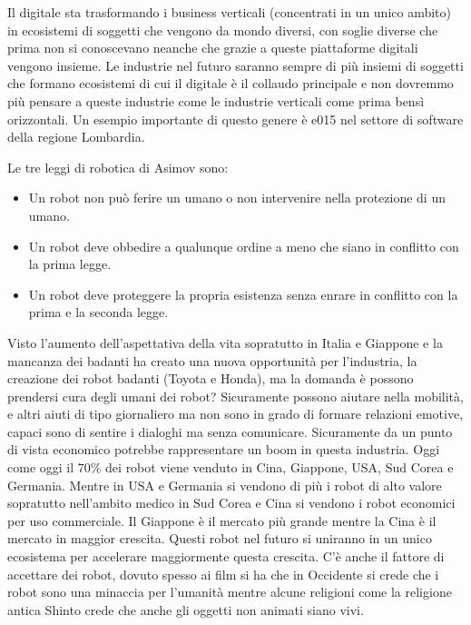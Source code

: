 \documentclass[a4page, 11pt]{article}
\begin{document}
Il digitale sta trasformando i business verticali (concentrati in un
unico ambito) in ecosistemi di soggetti che vengono da mondo diversi,
con soglie diverse che prima non si conoscevano neanche che grazie a
queste piattaforme digitali vengono insieme. Le industrie nel futuro
saranno sempre di più insiemi di soggetti che formano ecosistemi di cui
il digitale è il collaudo principale e non dovremmo più pensare a queste
industrie come le industrie verticali come prima bensì orizzontali. Un
esempio importante di questo genere è e015 nel settore di software della
regione Lombardia.

Le tre leggi di robotica di Asimov sono:

\begin{itemize}
	 
	\item
	Un robot non può ferire un umano o non intervenire nella protezione di
	un umano.
	\item
	Un robot deve obbedire a qualunque ordine a meno che siano in
	conflitto con la prima legge.
	\item
	Un robot deve proteggere la propria esistenza senza enrare in
	conflitto con la prima e la seconda legge.
\end{itemize}

Visto l'aumento dell'aspettativa della vita sopratutto in Italia e
Giappone e la mancanza dei badanti ha creato una nuova opportunità per
l'industria, la creazione dei robot badanti (Toyota e Honda), ma la
domanda è possono prendersi cura degli umani dei robot? Sicuramente
possono aiutare nella mobilità, e altri aiuti di tipo giornaliero ma non
sono in grado di formare relazioni emotive, capaci sono di sentire i
dialoghi ma senza comunicare. Sicuramente da un punto di vista economico
potrebbe rappresentare un boom in questa industria. Oggi come oggi il
70\% dei robot viene venduto in Cina, Giappone, USA, Sud Corea e
Germania. Mentre in USA e Germania si vendono di più i robot di alto
valore sopratutto nell'ambito medico in Sud Corea e Cina si vendono i
robot economici per uso commerciale. Il Giappone è il mercato più grande
mentre la Cina è il mercato in maggior crescita. Questi robot nel futuro
si uniranno in un unico ecosistema per accelerare maggiormente questa
crescita. C'è anche il fattore di accettare dei robot, dovuto spesso ai
film si ha che in Occidente si crede che i robot sono una minaccia per
l'umanità mentre alcune religioni come la religione antica Shinto crede
che anche gli oggetti non animati siano vivi.
\end{document}
